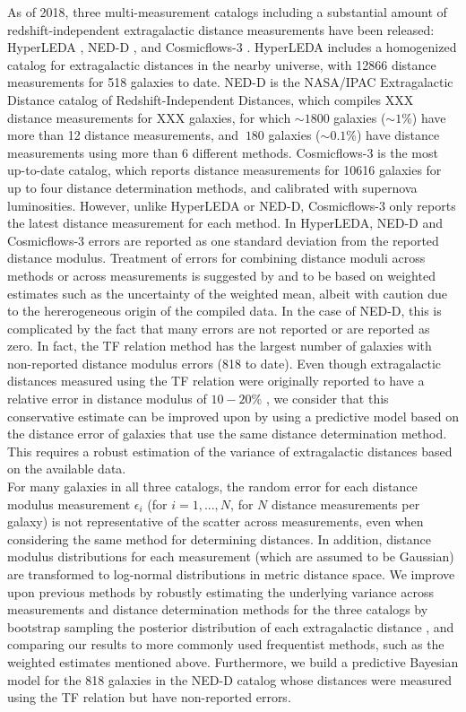\documentclass[a4paper,fleqn,usenatbib]{mnras}
\begin{document}
As of 2018, three multi-measurement catalogs including a substantial amount of redshift-independent extragalactic distance measurements have been released: HyperLEDA \citep{hyperleda}, NED-D \citep{ned07,ned}, and Cosmicflows-3 \citep{cosmicflows}. HyperLEDA includes a homogenized catalog for extragalactic distances in the nearby universe, with 12866 distance measurements for 518 galaxies to date. NED-D is the NASA/IPAC Extragalactic Distance catalog of Redshift-Independent Distances, which compiles XXX distance measurements for XXX galaxies, for which  $\sim1800$ galaxies ($\sim1$\%) have more than 12 distance measurements, and $~180$ galaxies ($\sim0.1$\%) have distance measurements using more than 6 different methods. Cosmicflows-3 is the most up-to-date catalog, which reports distance measurements for 10616 galaxies for up to four distance determination methods, and calibrated with supernova luminosities. However, unlike HyperLEDA or NED-D, Cosmicflows-3 only reports the latest distance measurement for each method. In HyperLEDA, NED-D and Cosmicflows-3 errors are reported as one standard deviation from the reported distance modulus. Treatment of errors for combining distance moduli across methods or across measurements is suggested by \citet{ned07} and \citet{cosmicflows} to be based on weighted estimates such as the uncertainty of the weighted mean, albeit with caution due to the hererogeneous origin of the compiled data. In the case of NED-D, this is complicated by the fact that many errors are not reported or are reported as zero. In fact, the TF relation method has the largest number of galaxies with non-reported distance modulus errors (818 to date). Even though extragalactic distances measured using the TF relation were originally reported to have a relative error in distance modulus of $10-20$\% \citep{tforig}, we consider that this conservative estimate can be improved upon by using a predictive model based on the distance error of galaxies that use the same distance determination method. This requires a robust estimation of the variance of extragalactic distances based on the available data.\\

For many galaxies in all three catalogs, the random error for each distance modulus measurement $\epsilon_i$ (for $i=1,...,N$, for $N$ distance measurements per galaxy) is not representative of the scatter across measurements, even when considering the same method for determining distances. In addition, distance modulus distributions for each measurement (which are assumed to be Gaussian) are transformed to log-normal distributions in metric distance space. We improve upon previous methods by robustly estimating the underlying variance across measurements and distance determination methods for the three catalogs by bootstrap sampling the posterior distribution of each extragalactic distance \citep{chaparro18}, and comparing our results to more commonly used frequentist methods, such as the weighted estimates mentioned above. Furthermore, we build a predictive Bayesian model for the 818 galaxies in the NED-D catalog whose distances were measured using the TF relation but have non-reported errors.\\
\end{document}
